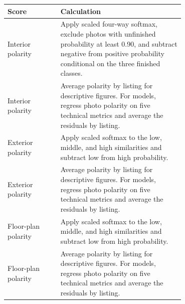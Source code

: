 \begin{tabular}{lp{0.70\linewidth}}
\toprule
Score & Calculation \\
\midrule
Interior polarity & Apply scaled four-way softmax, exclude photos with unfinished probability at least 0.90, and subtract negative from positive probability conditional on the three finished classes. \\
Interior polarity & Average polarity by listing for descriptive figures. For models, regress photo polarity on five technical metrics and average the residuals by listing. \\
Exterior polarity & Apply scaled softmax to the low, middle, and high similarities and subtract low from high probability. \\
Exterior polarity & Average polarity by listing for descriptive figures. For models, regress photo polarity on five technical metrics and average the residuals by listing. \\
Floor-plan polarity & Apply scaled softmax to the low, middle, and high similarities and subtract low from high probability. \\
Floor-plan polarity & Average polarity by listing for descriptive figures. For models, regress photo polarity on five technical metrics and average the residuals by listing. \\
\bottomrule
\end{tabular}
